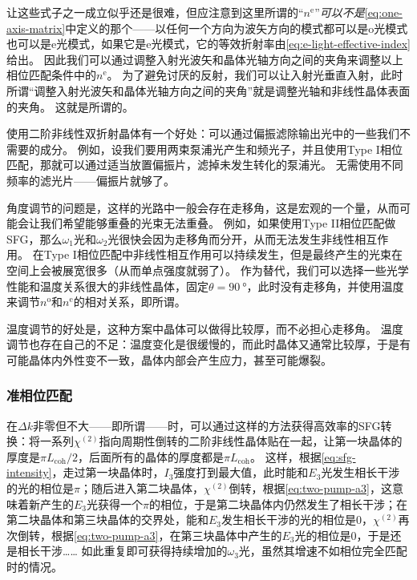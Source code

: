 让这些式子之一成立似乎还是很难，但应注意到这里所谓的“$n^\text{e}$”\emph{可以不是}\eqref{eq:one-axis-matrix}中定义的那个——以任何一个方向为波矢方向的模式都可以是o光模式也可以是e光模式，如果它是e光模式，它的等效折射率由\eqref{eq:e-light-effective-index}给出。
因此我们可以通过调整入射光波矢和晶体光轴方向之间的夹角来调整以上相位匹配条件中的$n^\text{e}$。
为了避免讨厌的反射，我们可以让入射光垂直入射，此时所谓“调整入射光波矢和晶体光轴方向之间的夹角”就是调整光轴和非线性晶体表面的夹角。
这就是所谓的。

使用二阶非线性双折射晶体有一个好处：可以通过偏振滤除输出光中的一些我们不需要的成分。
例如，设我们要用两束泵浦光产生和频光子，并且使用Type I相位匹配，那就可以通过适当放置偏振片，滤掉未发生转化的泵浦光。
无需使用不同频率的滤光片——偏振片就够了。

角度调节的问题是，这样的光路中一般会存在走移角，这是宏观的一个量，从而可能会让我们希望能够重叠的光束无法重叠。
例如，如果使用Type II相位匹配做SFG，那么$\omega_1$光和$\omega_2$光很快会因为走移角而分开，从而无法发生非线性相互作用。
在Type I相位匹配中非线性相互作用可以持续发生，但是最终产生的光束在空间上会被展宽很多（从而单点强度就弱了）。
作为替代，我们可以选择一些光学性能和温度关系很大的非线性晶体，固定$\theta = \SI{90}{\degree}$，此时没有走移角，并使用温度来调节$n^\text{o}$和$n^\text{e}$的相对关系，即所谓。

温度调节的好处是，这种方案中晶体可以做得比较厚，而不必担心走移角。
温度调节也存在自己的不足：温度变化是很缓慢的，而此时晶体又通常比较厚，于是有可能晶体内外性变不一致，晶体内部会产生应力，甚至可能爆裂。

\subsubsection{准相位匹配}

在$\Delta k$非零但不大——即所谓——时，可以通过这样的方法获得高效率的SFG转换：将一系列$\chi^{(2)}$指向周期性倒转的二阶非线性晶体贴在一起，让第一块晶体的厚度是$\pi L_\text{coh} / 2$，后面所有的晶体的厚度都是$\pi L_\text{coh}$。
这样，根据\eqref{eq:sfg-intensity}，走过第一块晶体时，$I_3$强度打到最大值，此时能和$E_3$光发生相长干涉的光的相位是$\pi$；随后进入第二块晶体，$\chi^{(2)}$倒转，根据\eqref{eq:two-pump-a3}，这意味着新产生的$E_3$光获得一个$\pi$的相位，于是第二块晶体内仍然发生了相长干涉；在第二块晶体和第三块晶体的交界处，能和$E_3$发生相长干涉的光的相位是$0$，$\chi^{(2)}$再次倒转，根据\eqref{eq:two-pump-a3}，在第三块晶体中产生的$E_3$光的相位是$0$，于是还是相长干涉……
如此重复即可获得持续增加的$\omega_3$光，虽然其增速不如相位完全匹配时的情况。

